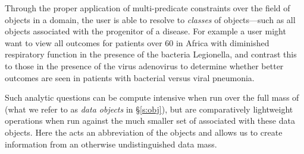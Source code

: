 Through the proper application of multi-predicate constraints over the field of objects in a domain, the user is able to resolve to \emph{classes} of objects---such as all objects associated with the progenitor of a disease. For example a user might want to view all outcomes for patients over 60 in Africa with diminished respiratory function in the presence of the bacteria Legionella, and contrast this to those in the presence of the virus adenovirus to determine whether better outcomes are seen in patients with bacterial versus viral pneumonia.

Such analytic questions can be compute intensive when run over the full mass of \ud{} (what we refer to as \emph{data objects} in \S\ref{s:obj}), but are comparatively lightweight operations when run against the much smaller set of \md{} associated with these data objects. Here the \md{} acts an abbreviation of the objects and allows us to create information from an otherwise undistinguished data mass.

